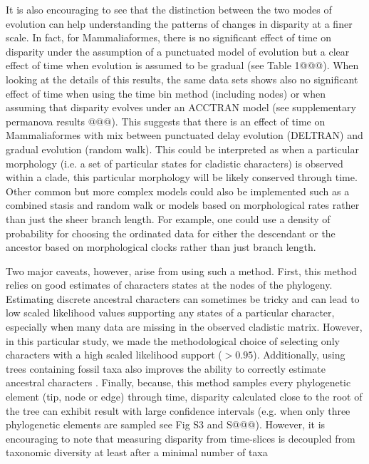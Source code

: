 \documentclass[12pt,letterpaper]{article}
\begin{document}
\begin{enumerate}
    It is also encouraging to see that the distinction between the two modes of evolution can help understanding the patterns of changes in disparity at a finer scale.
    In fact, for Mammaliaformes, there is no significant effect of time on disparity under the assumption of a punctuated model of evolution but a clear effect of time when evolution is assumed to be gradual (see Table 1@@@).
    When looking at the details of this results, the same data sets shows also no significant effect of time when using the time bin method (including nodes) or when assuming that disparity evolves under an ACCTRAN model (see supplementary permanova results @@@).
    This suggests that there is an effect of time on Mammaliaformes with mix between punctuated delay evolution (DELTRAN) and gradual evolution (random walk).
    This could be interpreted as when a particular morphology (i.e. a set of particular states for cladistic characters) is observed within a clade, this particular morphology will be likely conserved through time.
    Other common but more complex models could also be implemented such as a combined stasis and random walk \citep{Hunt21042015} or models based on morphological rates rather than just the sheer branch length.
    For example, one could use a density of probability for choosing the ordinated data for either the descendant or the ancestor based on morphological clocks rather than just branch length.
\end{enumerate}
Two major caveats, however, arise from using such a method.
First, this method relies on good estimates of characters states at the nodes of the phylogeny.
Estimating discrete ancestral characters can sometimes be tricky and can lead to low scaled likelihood values supporting any states of a particular character, especially when many data are missing in the observed cladistic matrix.
However, in this particular study, we made the methodological choice of selecting only characters with a high scaled likelihood support ($> 0.95$).
Additionally, using trees containing fossil taxa also improves the ability to correctly estimate ancestral characters \citep{Poly2001,Finarelli2006,Albert2009,Slater2012MEE}.
Finally, because, this method samples every phylogenetic element (tip, node or edge) through time, disparity calculated close to the root of the tree can exhibit result with large confidence intervals (e.g. when only three phylogenetic elements are sampled see Fig S3 and S@@@).
However, it is encouraging to note that measuring disparity from time-slices is decoupled from taxonomic diversity at least after a minimal number of taxa \citep{slaterCetacean,ruta2013,hopkinsdecoupling2013}
\end{document}
